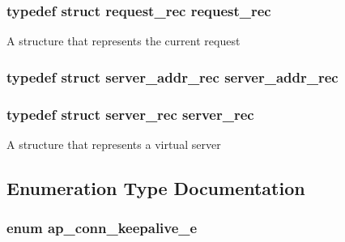 \subsubsection[{\texorpdfstring{request\+\_\+rec}{request_rec}}]{\setlength{\rightskip}{0pt plus 5cm}typedef struct {\bf request\+\_\+rec} {\bf request\+\_\+rec}}\hypertarget{group__APACHE__CORE__DAEMON_ga3128f4983d5f7a3c4e5d5b258f370ef4}{}\label{group__APACHE__CORE__DAEMON_ga3128f4983d5f7a3c4e5d5b258f370ef4}
A structure that represents the current request 
\subsubsection[{\texorpdfstring{server\+\_\+addr\+\_\+rec}{server_addr_rec}}]{\setlength{\rightskip}{0pt plus 5cm}typedef struct {\bf server\+\_\+addr\+\_\+rec} {\bf server\+\_\+addr\+\_\+rec}}\hypertarget{group__APACHE__CORE__DAEMON_ga9490881dcb192135f2ab47a5113ca651}{}\label{group__APACHE__CORE__DAEMON_ga9490881dcb192135f2ab47a5113ca651}
\subsubsection[{\texorpdfstring{server\+\_\+rec}{server_rec}}]{\setlength{\rightskip}{0pt plus 5cm}typedef struct {\bf server\+\_\+rec} {\bf server\+\_\+rec}}\hypertarget{group__APACHE__CORE__DAEMON_ga60fc5abfdd375bb9fd6288cb855972fa}{}\label{group__APACHE__CORE__DAEMON_ga60fc5abfdd375bb9fd6288cb855972fa}
A structure that represents a virtual server 

\subsection{Enumeration Type Documentation}
\subsubsection[{\texorpdfstring{ap\+\_\+conn\+\_\+keepalive\+\_\+e}{ap_conn_keepalive_e}}]{\setlength{\rightskip}{0pt plus 5cm}enum {\bf ap\+\_\+conn\+\_\+keepalive\+\_\+e}}\hypertarget{group__APACHE__CORE__DAEMON_ga0fc39bb8f47f9c1f418f28354416db79}{}\label{group__APACHE__CORE__DAEMON_ga0fc39bb8f47f9c1f418f28354416db79}


